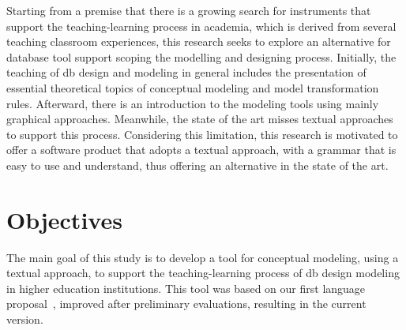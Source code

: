 Starting from a premise that there is a growing search for instruments that support the teaching-learning process in academia, which is derived from several teaching classroom experiences, this research seeks to explore an alternative for database tool support scoping the modelling and designing process.
Initially, the teaching of \ac{db} design and modeling in general includes the presentation of essential theoretical topics of conceptual modeling and model transformation rules.
Afterward, there is an introduction to the  modeling tools using %
mainly graphical approaches. Meanwhile, the state of the art misses textual approaches to support this process.
Considering this limitation, this research is motivated to offer a software product that adopts a textual approach, with a grammar that is easy to use and understand, thus offering an alternative in the state of the art.

\section{Objectives}

The main goal of this study is to develop a tool for conceptual modeling, using a textual approach, to support the teaching-learning process of \ac{db} design modeling in higher education institutions.
This tool was based on our first language proposal~\cite{Lopes:2019}, improved after preliminary evaluations, resulting in the current version.

